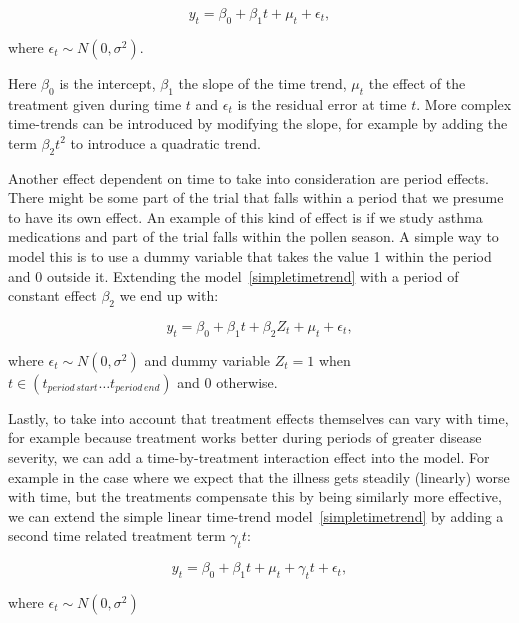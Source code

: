 \documentclass[12pt,a4paper,leqno]{report}
\theoremstyle{plain}
\theoremstyle{definition}
\theoremstyle{remark}
\begin{document}
\begin{def}\label{}
    \begin{equation}\label{simpletimetrend}
        y_t = \beta_0 + \beta_1 t + \mu_t + \epsilon_t,
    \end{equation}
\end{def}where \(\epsilon_t \sim N(0,\sigma^2)\).

Here \(\beta_0\) is the intercept, \(\beta_1\) the slope of the time trend,
\(\mu_t\) the effect of the treatment given during time \(t\) and \(\epsilon_t\)
is the residual error at time \(t\). More complex time-trends can be introduced
by modifying the slope, for example by adding the term \(\beta_2 t^2\) to
introduce a quadratic trend.

Another effect dependent on time to take into consideration are period effects.
There might be some part of the trial that falls within a period that we presume
to have its own effect. An example of this kind of effect is if we study asthma
medications and part of the trial falls within the pollen season. A simple way
to model this is to use a dummy variable that takes the value 1 within the
period and 0 outside it. Extending the model\ \ref{simpletimetrend} with a period of constant
effect \(\beta_2\) we end up with:

\begin{def}\label{}
    \begin{equation}\label{}
        y_t = \beta_0 + \beta_1 t + \beta_{2}Z_t + \mu_t + \epsilon_t,
    \end{equation}
\end{def}where \(\epsilon_t \sim N(0,\sigma^2)\) and dummy variable \(Z_t = 1\)
when \(t \in (t_{period\,start} \ldots t_{period\,end}) \) and \(0\) otherwise.

Lastly, to take into account that treatment effects themselves can vary with
time, for example because treatment works better during periods of greater
disease severity, we can add a time-by-treatment interaction effect into the
model. For example in the case where we expect that the illness gets steadily
(linearly) worse with time, but the treatments compensate this by being
similarly more effective, we can extend the simple linear time-trend model\ \ref{simpletimetrend} by adding a second time related treatment term \(\gamma_t t\):

\begin{def}\label{}
    \begin{equation}\label{}
        y_t = \beta_0 + \beta_1 t + \mu_t + \gamma_t t + \epsilon_t,
    \end{equation}
\end{def}where \(\epsilon_t \sim N(0,\sigma^2)\)
\end{document}
